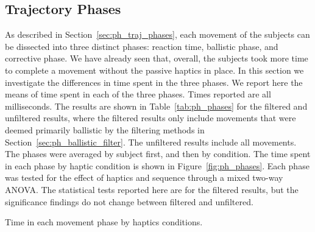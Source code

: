\subsection{Trajectory Phases}

As described in Section~\ref{sec:ph_traj_phases}, each movement of the subjects can be dissected into three distinct phases: reaction time, ballistic phase, and corrective phase.
We have already seen that, overall, the subjects took more time to complete a movement without the passive haptics in place.
In this section we investigate the differences in time spent in the three phases.
We report here the means of time spent in each of the three phases.
Times reported are all milliseconds.
The results are shown in Table~\ref{tab:ph_phases} for the filtered and unfiltered results, where the filtered results only include movements that were deemed primarily ballistic by the filtering methods in Section~\ref{sec:ph_ballistic_filter}.
The unfiltered results include all movements.
The phases were averaged by subject first, and then by condition.
The time spent in each phase by haptic condition is shown in Figure~\ref{fig:ph_phases}.
Each phase was tested for the effect of haptics and sequence through a mixed two-way ANOVA.
The statistical tests reported here are for the filtered results, but the significance findings do not change between filtered and unfiltered.

\begin{table}
    \centering
    \caption{Time in each movement phase by haptics conditions.}
    \label{tab:ph_phases}
\end{table}

